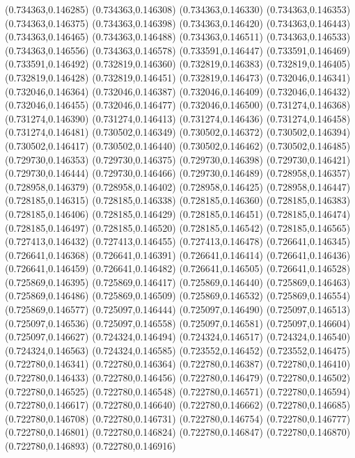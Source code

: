 (0.734363,0.146285)
(0.734363,0.146308)
(0.734363,0.146330)
(0.734363,0.146353)
(0.734363,0.146375)
(0.734363,0.146398)
(0.734363,0.146420)
(0.734363,0.146443)
(0.734363,0.146465)
(0.734363,0.146488)
(0.734363,0.146511)
(0.734363,0.146533)
(0.734363,0.146556)
(0.734363,0.146578)
(0.733591,0.146447)
(0.733591,0.146469)
(0.733591,0.146492)
(0.732819,0.146360)
(0.732819,0.146383)
(0.732819,0.146405)
(0.732819,0.146428)
(0.732819,0.146451)
(0.732819,0.146473)
(0.732046,0.146341)
(0.732046,0.146364)
(0.732046,0.146387)
(0.732046,0.146409)
(0.732046,0.146432)
(0.732046,0.146455)
(0.732046,0.146477)
(0.732046,0.146500)
(0.731274,0.146368)
(0.731274,0.146390)
(0.731274,0.146413)
(0.731274,0.146436)
(0.731274,0.146458)
(0.731274,0.146481)
(0.730502,0.146349)
(0.730502,0.146372)
(0.730502,0.146394)
(0.730502,0.146417)
(0.730502,0.146440)
(0.730502,0.146462)
(0.730502,0.146485)
(0.729730,0.146353)
(0.729730,0.146375)
(0.729730,0.146398)
(0.729730,0.146421)
(0.729730,0.146444)
(0.729730,0.146466)
(0.729730,0.146489)
(0.728958,0.146357)
(0.728958,0.146379)
(0.728958,0.146402)
(0.728958,0.146425)
(0.728958,0.146447)
(0.728185,0.146315)
(0.728185,0.146338)
(0.728185,0.146360)
(0.728185,0.146383)
(0.728185,0.146406)
(0.728185,0.146429)
(0.728185,0.146451)
(0.728185,0.146474)
(0.728185,0.146497)
(0.728185,0.146520)
(0.728185,0.146542)
(0.728185,0.146565)
(0.727413,0.146432)
(0.727413,0.146455)
(0.727413,0.146478)
(0.726641,0.146345)
(0.726641,0.146368)
(0.726641,0.146391)
(0.726641,0.146414)
(0.726641,0.146436)
(0.726641,0.146459)
(0.726641,0.146482)
(0.726641,0.146505)
(0.726641,0.146528)
(0.725869,0.146395)
(0.725869,0.146417)
(0.725869,0.146440)
(0.725869,0.146463)
(0.725869,0.146486)
(0.725869,0.146509)
(0.725869,0.146532)
(0.725869,0.146554)
(0.725869,0.146577)
(0.725097,0.146444)
(0.725097,0.146490)
(0.725097,0.146513)
(0.725097,0.146536)
(0.725097,0.146558)
(0.725097,0.146581)
(0.725097,0.146604)
(0.725097,0.146627)
(0.724324,0.146494)
(0.724324,0.146517)
(0.724324,0.146540)
(0.724324,0.146563)
(0.724324,0.146585)
(0.723552,0.146452)
(0.723552,0.146475)
(0.722780,0.146341)
(0.722780,0.146364)
(0.722780,0.146387)
(0.722780,0.146410)
(0.722780,0.146433)
(0.722780,0.146456)
(0.722780,0.146479)
(0.722780,0.146502)
(0.722780,0.146525)
(0.722780,0.146548)
(0.722780,0.146571)
(0.722780,0.146594)
(0.722780,0.146617)
(0.722780,0.146640)
(0.722780,0.146662)
(0.722780,0.146685)
(0.722780,0.146708)
(0.722780,0.146731)
(0.722780,0.146754)
(0.722780,0.146777)
(0.722780,0.146801)
(0.722780,0.146824)
(0.722780,0.146847)
(0.722780,0.146870)
(0.722780,0.146893)
(0.722780,0.146916)
